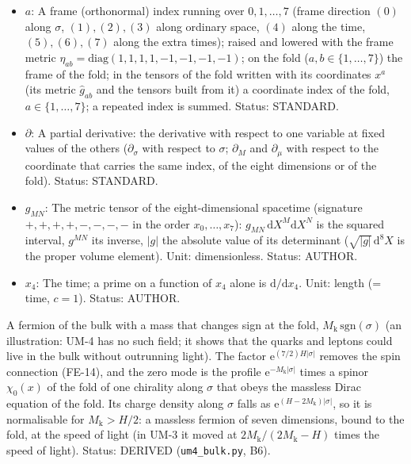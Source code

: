\documentclass[
  10pt,
]{article}
\begin{document}
\begin{itemize}
  along the coordinates, \(\gamma^M = \mathbf{e}_a{}^MT^a\),
  \(\gamma_M = g_{MN}\gamma^N\); \(\gamma^{(a)} = T^a\) along the frame
  direction \((a)\) (\(\gamma^{(0)}\) along \(\sigma\), \(\gamma^{(4)}\)
  along the time). Unit: dimensionless. Status: AUTHOR.
\item
  \(a\): A frame (orthonormal) index running over \(0, 1, \dots, 7\)
  (frame direction \((0)\) along \(\sigma\), \((1), (2), (3)\) along
  ordinary space, \((4)\) along the time, \((5), (6), (7)\) along the
  extra times); raised and lowered with the frame metric
  \(\eta_{ab} = \mathrm{diag}(1, 1, 1, 1, -1, -1, -1, -1)\); on the fold
  (\(a, b \in \{1, \dots, 7\}\)) the frame of the fold; in the tensors
  of the fold written with its coordinates \(x^a\) (its metric
  \(\hat g_{ab}\) and the tensors built from it) a coordinate index of
  the fold, \(a \in \{1, \dots, 7\}\); a repeated index is summed.
  Status: STANDARD.
\item
  \(\partial\): A partial derivative: the derivative with respect to one
  variable at fixed values of the others (\(\partial_\sigma\) with
  respect to \(\sigma\); \(\partial_M\) and \(\partial_\mu\) with
  respect to the coordinate that carries the same index, of the eight
  dimensions or of the fold). Status: STANDARD.
\item
  \(g_{MN}\): The metric tensor of the eight-dimensional spacetime
  (signature \(+,+,+,+,-,-,-,-\) in the order \(x_0, \dots, x_7\)):
  \(g_{MN}\,\mathrm{d}X^M\mathrm{d}X^N\) is the squared interval,
  \(g^{MN}\) its inverse, \(\lvert g\rvert\) the absolute value of its
  determinant (\(\sqrt{\lvert g\rvert}\,\mathrm{d}^8X\) is the proper
  volume element). Unit: dimensionless. Status: AUTHOR.
\item
  \(x_4\): The time; a prime on a function of \(x_4\) alone is
  \(\mathrm{d}/\mathrm{d}x_4\). Unit: length (= time, \(c = 1\)).
  Status: AUTHOR.
\end{itemize}

A fermion of the bulk with a mass that changes sign at the fold,
\(M_{\mathrm{k}}\,\mathrm{sgn}(\sigma)\) (an illustration: UM-4 has no
such field; it shows that the quarks and leptons could live in the bulk
without outrunning light). The factor
\(\mathrm{e}^{(7/2)H\lvert\sigma\rvert}\) removes the spin connection
(FE-14), and the zero mode is the profile
\(\mathrm{e}^{-M_{\mathrm{k}}\lvert\sigma\rvert}\) times a spinor
\(\chi_0(x)\) of the fold of one chirality along \(\sigma\) that obeys
the massless Dirac equation of the fold. Its charge density along
\(\sigma\) falls as
\(\mathrm{e}^{(H - 2M_{\mathrm{k}})\lvert\sigma\rvert}\), so it is
normalisable for \(M_{\mathrm{k}} > H/2\): a massless fermion of seven
dimensions, bound to the fold, at the speed of light (in UM-3 it moved
at \(2M_{\mathrm{k}}/(2M_{\mathrm{k}} - H)\) times the speed of light).
Status: DERIVED (\texttt{um4\_bulk.py}, B6).
\end{document}
